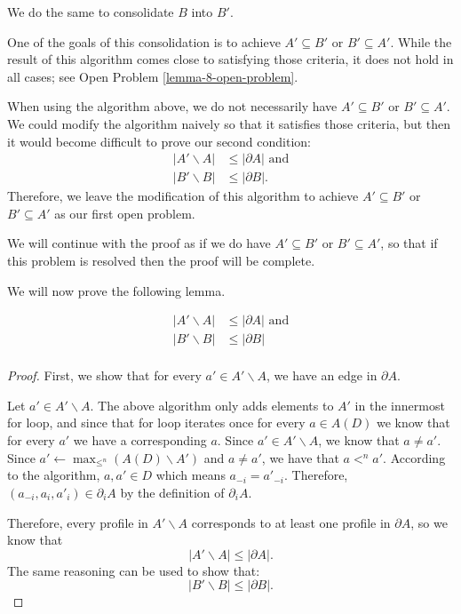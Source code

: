 	We do the same to consolidate $B$ into $B'$.

	One of the goals of this consolidation is to achieve $A' \subseteq B'$ or $B' \subseteq A'$. While the result of this algorithm comes close to satisfying those criteria, it does not hold in all cases; see Open Problem \ref{lemma-8-open-problem}.

	\begin{openproblem}
		\label{lemma-8-open-problem}
		When using the algorithm above, we do not necessarily have $A' \subseteq B'$ or $B' \subseteq A'$. We could modify the algorithm naively so that it satisfies those criteria, but then it would become difficult to prove our second condition:
		\begin{align*}
			|A' \backslash A| &\le |\partial A| \textrm{ and} \\
			|B' \backslash B| &\le |\partial B|.
		\end{align*}
		Therefore, we leave the modification of this algorithm to achieve $A' \subseteq B'$ or $B' \subseteq A'$ as our first open problem.

		We will continue with the proof as if we do have $A' \subseteq B'$ or $B' \subseteq A'$, so that if this problem is resolved then the proof will be complete.
	\end{openproblem}

	We will now prove the following lemma.
	\begin{lemma}
		\label{lemma-8-enough-edges}
		\begin{align*}
			|A' \backslash A| &\le |\partial A| \textrm{ and} \\
			|B' \backslash B| &\le |\partial B| \\
		\end{align*}
	\end{lemma}

	\begin{proof}
		First, we show that for every $a' \in A' \backslash A$, we have an edge in $\partial A$.

		Let $a' \in A' \backslash A$. The above algorithm only adds elements to $A'$ in the innermost for loop, and since that for loop iterates once for every $a \in A(D)$ we know that for every $a'$ we have a corresponding $a$. Since $a' \in A' \backslash A$, we know that $a \ne a'$. Since $a' \gets \max_{\le^n}(A(D) \backslash A')$ and $a \ne a'$, we have that $a <^n a'$. According to the algorithm, $a, a' \in D$ which means $a_{-i} = a'_{-i}$. Therefore, $(a_{-i}, a_i, a'_i) \in \partial_i A$ by the definition of $\partial_i A$.

		Therefore, every profile in $A' \backslash A$ corresponds to at least one profile in $\partial A$, so we know that
		\[
			|A' \backslash A| \le |\partial A|.
		\]
		The same reasoning can be used to show that:
		\[
			|B' \backslash B| \le |\partial B|.
		\]
	\end{proof}

